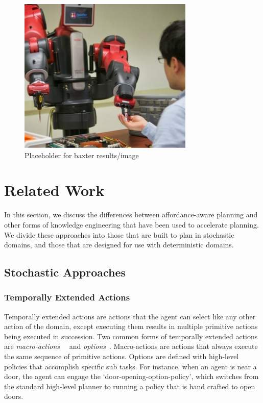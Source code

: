 \documentclass[conference]{IEEEtran}
\begin{document}
\begin{figure}[H]
\centering
\includegraphics[scale=0.195]{figures/baxter_temp.jpg}%
  \caption{Placeholder for baxter results/image}
  \label{fig:baxter_results}
\end{figure}

\section{Related Work}
\label{sec:related-work}

In this section, we discuss the differences between
affordance-aware planning and other forms of knowledge engineering that
have been used to accelerate planning. We divide these approaches
into those that are built to plan in stochastic domains, and those that are
designed for use with deterministic domains.

\subsection{Stochastic Approaches}

\subsubsection{Temporally Extended Actions}
Temporally extended actions are actions that the agent can
select like any other action of the domain, except executing them
results in multiple primitive actions being executed in
succession. Two common forms of temporally extended actions are {\em
  macro-actions}~\cite{hauskrecht98} ~and {\em options}~\cite{sutton99}. 
Macro-actions are actions that always
execute the same sequence of primitive actions. Options are defined
with high-level policies that accomplish specific sub tasks. For
instance, when an agent is near a door, the agent can engage the
`door-opening-option-policy', which switches from the standard
high-level planner to running a policy that is hand crafted to open
doors. 
\end{document}
